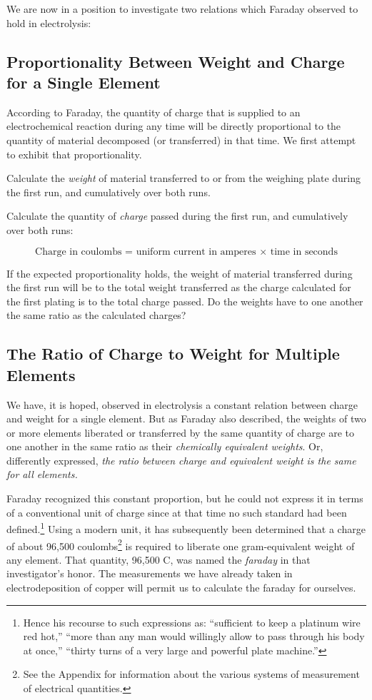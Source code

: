 We are now in a position to investigate two relations which Faraday
observed to hold in electrolysis:

\subsection{Proportionality Between Weight and Charge for a Single Element}

According to Faraday, the quantity of charge that is supplied to an
electrochemical reaction during any time will be directly proportional
to the quantity of material de\-com\-posed (or transferred) in that time. We
first attempt to exhibit that proportionality.

Calculate the \emph{weight} of material transferred to or from the
weighing plate during the first run, and cumulatively over both runs.

Calculate the quantity of \emph{charge} passed during the first run, and
cumulatively over both runs:

\begin{equation*}
\text{Charge in coulombs = uniform current in amperes $\times$ time in seconds}
\end{equation*}

If the expected proportionality holds, the weight of material
transferred during the first run will be to the total weight transferred
as the charge calculated for the first plating is to the total charge
passed. Do the weights have to one another the same ratio as the
calculated charges?

\subsection{The Ratio of Charge to Weight for Multiple Elements}

We have, it is hoped, observed in electrolysis a constant relation
between charge and weight for a single element. But as Faraday also
described, the weights of two or more elements liberated or transferred
by the same quantity of charge are to one another in the same ratio as
their \emph{chemically equivalent weights}. Or, differently expressed,
\emph{the ratio between charge and equivalent weight is the same for all
elements.}

Faraday recognized this constant proportion, but he could not express it
in terms of a conventional unit of charge since at that time no such
standard had been defined.\footnote{Hence his recourse to such
  expressions as: ``sufficient to keep a platinum wire red hot,'' ``more
  than any man would willingly allow to pass through his body at once,''
  ``thirty turns of a very large and powerful plate machine.''} Using a
modern unit, it has subsequently been determined that a charge of about
96,500 coulombs\footnote{See the Appendix for information about the
various systems of measurement of electrical quantities.} is
required to liberate one gram-equivalent weight of any element. That
quantity, 96,500 C, was named the \emph{faraday} in that
investigator's honor. The mea\-sure\-ments we have already taken in
electrodeposition of copper will permit us to calculate the faraday for
ourselves.

